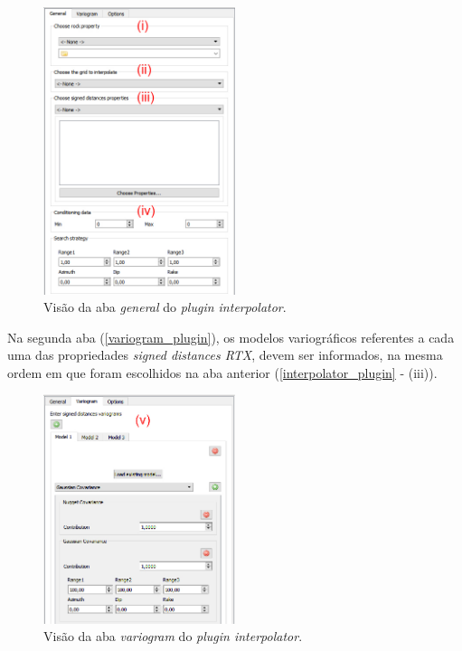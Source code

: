 \begin{figure}[H]
	\caption{\label{interpolator_plugin}Visão da aba \textit{general} do \textit{plugin interpolator}.}
	\begin{center}
		\includegraphics[width=0.5\textwidth]{modelagem_geologica/interpolator_plugin}
	\end{center}
\end{figure}

Na segunda aba (\autoref{variogram_plugin}), os modelos variográficos referentes a cada uma das propriedades \textit{signed distances RTX}, devem ser informados, na mesma ordem em que foram escolhidos na aba anterior (\autoref{interpolator_plugin} - (iii)). 

\begin{figure}[H]
	\caption{\label{variogram_plugin}Visão da aba \textit{variogram} do \textit{plugin interpolator}.}
	\begin{center}
		\includegraphics[width=0.5\textwidth]{modelagem_geologica/variogram_plugin}
	\end{center}
\end{figure}

